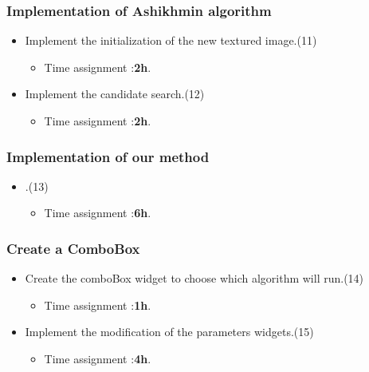 \documentclass[12pt]{article}
\begin{document}
\subsubsection{\textbf{Implementation of Ashikhmin algorithm}}
\begin{itemize}
	\item Implement the initialization of the new textured image.(11)
	      \begin{itemize}
	      	\item Time assignment :\textbf{2h}.
	      \end{itemize}
        \item Implement the candidate search.(12)
	      \begin{itemize}
	      	\item Time assignment :\textbf{2h}.
	      \end{itemize}
\end{itemize}
\medbreak
\subsubsection{\textbf{Implementation of our method}}
\begin{itemize}
	\item .(13)
	      \begin{itemize}
	      	\item Time assignment :\textbf{6h}.
	      \end{itemize}
\end{itemize}
\medbreak
\subsubsection{\textbf{Create a ComboBox}}
\begin{itemize}
	\item Create the comboBox widget to choose which algorithm will run.(14)
	      \begin{itemize}
	      	\item Time assignment :\textbf{1h}.
	      \end{itemize}
        \item Implement the modification of the parameters widgets.(15)
	      \begin{itemize}
	      	\item Time assignment :\textbf{4h}.
	      \end{itemize}
\end{itemize}
\medbreak
\end{document}
